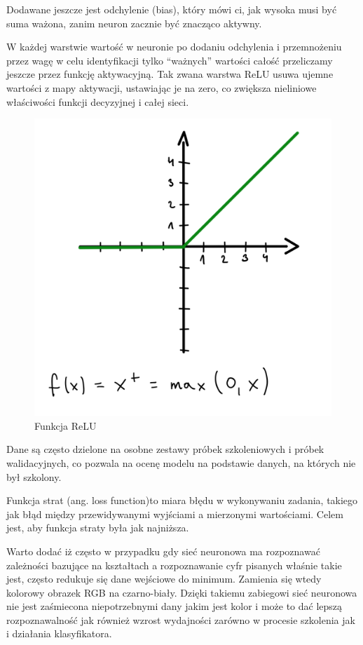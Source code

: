 \documentclass[brudnopis]{xmgr}
\begin{document}
Dodawane jeszcze jest odchylenie (bias), który mówi ci, jak wysoka musi być suma ważona, zanim neuron zacznie być znacząco aktywny.

W każdej warstwie  wartość w neuronie po dodaniu odchylenia i przemnożeniu przez wagę w celu identyfikacji tylko “ważnych” wartości całość przeliczamy jeszcze przez funkcję aktywacyjną. 
Tak zwana warstwa ReLU usuwa ujemne wartości z mapy aktywacji, ustawiając je na zero, co zwiększa nieliniowe właściwości funkcji decyzyjnej i całej sieci.

\begin{figure}[!tbh]
\centering
\includegraphics[width=.8\hsize]{fig/4}
\caption{Funkcja ReLU\label{RYS.4}}
\end{figure}


Dane są często dzielone na osobne zestawy próbek szkoleniowych i próbek walidacyjnych, co pozwala na ocenę modelu na podstawie danych, na których nie był szkolony.
 
Funkcja strat (ang. loss function)to miara błędu w wykonywaniu zadania, takiego jak błąd między przewidywanymi wyjściami a mierzonymi wartościami. Celem jest, aby funkcja straty była jak najniższa.

Warto dodać iż często w przypadku gdy sieć neuronowa ma rozpoznawać zależności bazujące na kształtach a rozpoznawanie cyfr pisanych właśnie takie jest, często redukuje się dane wejściowe do minimum. Zamienia się wtedy kolorowy obrazek RGB na czarno-biały. Dzięki takiemu zabiegowi sieć neuronowa nie jest zaśmiecona niepotrzebnymi dany jakim jest kolor i może to dać lepszą rozpoznawalność jak również wzrost wydajności zarówno w procesie szkolenia jak i działania klasyfikatora.  
\end{document}
